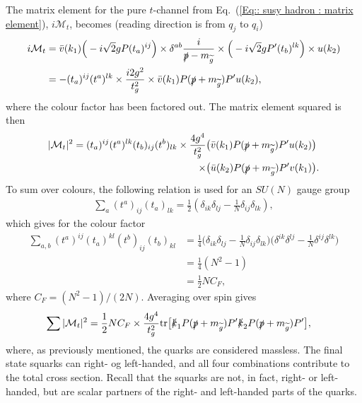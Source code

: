 \documentclass[twoside,english]{uiofysmaster}
\begin{document}
{The matrix element for the pure $t$-channel from Eq.~(\ref{Eq:: susy hadron : matrix element}), $i\mathcal{M}_t$, becomes (reading direction is from $q_j$ to $q_i$)
\begin{align*}
i \mathcal{M}_t &= \bar{v} (k_1) \Big( -i \sqrt{2} g P (t_a)^{ij}\Big) \times \delta^{ab} \frac{i}{\slashed{p} - m_{\widetilde{g}}} \times \Big( -i \sqrt{2} gP'(t_b)^{lk} \Big) \times u(k_2)\\
&= - (t_a)^{ij}(t^a)^{lk} \times \frac{i 2 g^2}{t_g^2} \times  \bar{v} (k_1)  P (\slashed{p} + m_{\widetilde{g}}) P' u(k_2) ,
\end{align*}
where the colour factor has been factored out. The matrix element squared is then
\begin{align*}
|\mathcal{M}_t|^2 =  (t_a)^{ij} (t^a)^{lk} (t_b)_{ij} (t^b)_{lk} \times \frac{4 g^4}{t_g^2}&
\big( \bar{v} (k_1)  P (\slashed{p} + m_{\widetilde{g}}) P' u(k_2) \big)
\\ \times &\big( \bar{u} (k_2)  P (\slashed{p} + m_{\widetilde{g}}) P' v(k_1) \big).
\end{align*}
To sum over colours, the following relation is used for an $SU(N)$ gauge group \cite{ellis2003qcd}
\begin{align}\label{Eq:: susy hadron : color factor identity}
\sum_a (t^a)_{ij} (t_a)_{lk} = \frac{1}{2} (\delta_{ik} \delta_{lj} - \frac{1}{N} \delta_{ij} \delta_{lk}),
\end{align}
which gives for the colour factor
\begin{align*}
\sum_{a,b} (t^a)^{ij}(t_a)^{kl}(t^b)_{ij}(t_b)_{kl} &= \frac{1}{4} 
\big(\delta_{ik} \delta_{lj} - \frac{1}{N} \delta_{ij} \delta_{lk} \big)
\big(\delta^{ik} \delta^{lj} - \frac{1}{N} \delta^{ij} \delta^{lk} \big)\\& = \frac{1}{4} (N^2 - 1)\\& = \frac{1}{2}NC_F,
\end{align*}
where $C_F = (N^2 - 1)/(2N)$. Averaging over spin gives
\begin{align*}
\sum |\mathcal{M}_t|^2 &= \frac{1}{2} NC_F \times \frac{4 g^4}{t_g^2} \text{tr} \big[ 
\slashed{k}_1 P (\slashed{p} + m_{\widetilde{g}}) P' \slashed{k}_2 P (\slashed{p} + m_{\widetilde{g}}) P' \big],
\end{align*}
where, as previously mentioned, the quarks are considered massless. The final state squarks can right- og left-handed, and all four combinations contribute to the total cross section. Recall that the squarks are not, in fact, right- or left-handed, but are scalar partners of the right- and left-handed parts of the quarks. 

}
\end{document}
